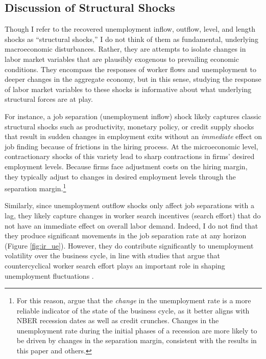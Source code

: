 \documentclass[12pt]{article}
\begin{document}
\subsection{Discussion of Structural Shocks}

Though I refer to the recovered unemployment inflow, outflow, level, and length shocks as ``structural shocks,'' I do not think of them as fundamental, underlying macroeconomic disturbances. Rather, they are attempts to isolate changes in labor market variables that are plausibly exogenous to prevailing economic conditions. They encompass the responses of worker flows and unemployment to deeper changes in the aggregate economy, but in this sense, studying the response of labor market variables to these shocks is informative about what underlying structural forces are at play. 

For instance, a job separation (unemployment inflow) shock likely captures classic structural shocks such as productivity, monetary policy, or credit supply shocks that result in sudden changes in employment exits without an \textit{immediate} effect on job finding because of frictions in the hiring process. At the microeconomic level, contractionary shocks of this variety lead to sharp contractions in firms' desired employment levels. Because firms face adjustment costs on the hiring margin, they typically adjust to changes in desired employment levels through the separation margin.\footnote{For this reason, \cite{Haltiwanger:2018ab} argue that the \textit{change} in the unemployment rate is a more reliable indicator of the state of the business cycle, as it better aligns with NBER recession dates as well as credit crunches. Changes in the unemployment rate during the initial phases of a recession are more likely to be driven by changes in the separation margin, consistent with the results in this paper and others.}

Similarly, since unemployment outflow shocks only affect job separations with a lag, they likely capture changes in worker search incentives (search effort) that do not have an immediate effect on overall labor demand. Indeed, I do not find that they produce significant movements in the job separation rate at any horizon (Figure \ref{fig:ir_ue}). However, they do contribute significantly to unemployment volatility over the business cycle, in line with studies that argue that countercyclical worker search effort plays an important role in shaping unemployment fluctuations \citep{Mukoyama:2018aa, Graves:2024aa}.
\end{document}
